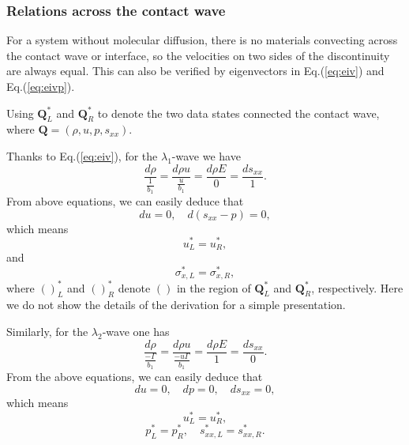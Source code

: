 \documentclass{article}
\numberwithin{equation}{section}
\numberwithin{table}{section}
\begin{document}
\subsubsection{Relations across the contact wave}\label{sec:contacte}
  For  a  system without molecular diffusion, there is no materials convecting  across the contact wave or interface, so the velocities on two sides of  the discontinuity are always equal. %
  This can also be verified by eigenvectors in Eq.(\ref{eq:eiv}) and  Eq.(\ref{eq:eivp}).

Using $\mathbf{Q}_L^*$ and $\mathbf{Q}_R^*$ to denote the two data states connected the contact wave, where $\mathbf{Q}=\left(\rho,u,p,s_{xx}\right)$.


Thanks to Eq.(\ref{eq:eiv}), for the $\lambda_{1}$-wave we
have
\begin{equation}   \label{e23a}
\frac{d \rho}{\frac{1}{b_{1}}} = \frac{d \rho u}{\frac{u
}{b_{1}}}=\frac{d \rho E}{0} = \frac{d s_{xx}}{1}.
\end{equation}
From above equations, we can easily deduce that
\begin{equation}   \label{e23b}
du = 0, \quad d(s_{xx}-p)=0,
\end{equation}
 which means
\begin{equation}   \label{e23c}
  u_{L}^{\ast}=u_{R}^{\ast},
\end{equation}
and
\begin{equation}   \label{e23d}
\sigma_{x,L}^{\ast}=\sigma_{x,R}^{\ast},
\end{equation}
where $()_{L}^{\ast}$ and $()_{R}^{\ast}$ denote $()$ in the region
of $\mathbf{Q}_{L}^{\ast}$ and $\mathbf{Q}_{R}^{\ast}$,
respectively. Here we do not show the details of the derivation for a simple
 presentation.


Similarly, for the $\lambda_{2}$-wave one
has
\begin{equation}   \label{e24a}
\frac{d \rho}{\frac{-\Gamma}{b_{1}}} = \frac{d \rho u}{\frac{-u
\Gamma}{b_{1}}}=\frac{d \rho E}{1} = \frac{d s_{xx}}{0}.
\end{equation}
From the above equations, we can easily deduce  that
\begin{equation}   \label{e24b}
du = 0, \quad dp=0, \quad ds_{xx}=0,
\end{equation}
 which means
\begin{equation}   \label{e24c}
  u_{L}^{\ast}=u_{R}^{\ast},
\end{equation}
\begin{equation}   \label{e24d}
p_{L}^{\ast}=p_{R}^{\ast}, \quad
  s_{xx,L}^{\ast}=s_{xx,R}^{\ast}.
\end{equation}
\end{document}
